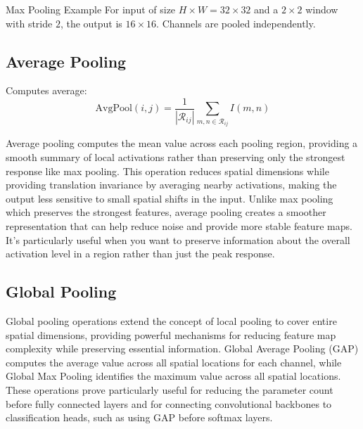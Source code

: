 \begin{examplebox}{Max Pooling Example}
For input of size $H\times W=32\times32$ and a $2\times2$ window with stride $2$, the output is $16\times16$. Channels are pooled independently.
\end{examplebox}

\subsection{Average Pooling}

Computes average:
\begin{equation}
\text{AvgPool}(i,j) = \frac{1}{|\mathcal{R}_{ij}|} \sum_{m,n \in \mathcal{R}_{ij}} I(m,n)
\end{equation}

Average pooling computes the mean value across each pooling region, providing a smooth summary of local activations rather than preserving only the strongest response like max pooling. This operation reduces spatial dimensions while providing translation invariance by averaging nearby activations, making the output less sensitive to small spatial shifts in the input. Unlike max pooling which preserves the strongest features, average pooling creates a smoother representation that can help reduce noise and provide more stable feature maps. It's particularly useful when you want to preserve information about the overall activation level in a region rather than just the peak response.

\subsection{Global Pooling}

Global pooling operations extend the concept of local pooling to cover entire spatial dimensions, providing powerful mechanisms for reducing feature map complexity while preserving essential information. Global Average Pooling (GAP) computes the average value across all spatial locations for each channel, while Global Max Pooling identifies the maximum value across all spatial locations. These operations prove particularly useful for reducing the parameter count before fully connected layers and for connecting convolutional backbones to classification heads, such as using GAP before softmax layers.

